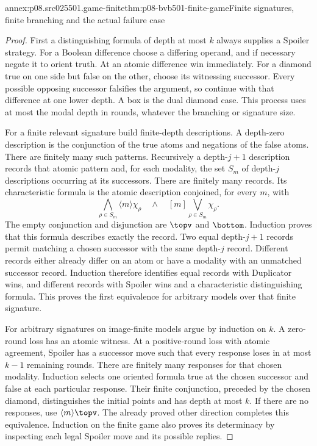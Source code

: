 \begin{annexitem}{annex:p08.src025501.game-finite}{thm:p08-bvb501-finite-game}{Finite signatures, finite branching and the actual failure case}
\begin{proof}
First a distinguishing formula of depth at most \(k\) always supplies
a Spoiler strategy. For a Boolean difference choose a differing operand,
and if necessary negate it to orient truth. At an atomic difference win
immediately. For a diamond true on one side but false on the other,
choose its witnessing successor. Every possible opposing successor falsifies
the argument, so continue with that difference at one lower depth. A box
is the dual diamond case. This process uses at most the modal depth in
rounds, whatever the branching or signature size.

For a finite relevant signature build finite-depth descriptions. A depth-zero
description is the conjunction of the true atoms and negations of the false
atoms. There are finitely many such patterns. Recursively a depth-\(j+1\)
description records that atomic pattern and, for each modality, the set
\(S_m\) of depth-\(j\) descriptions occurring at its successors.
There are finitely many records. Its characteristic formula is the atomic
description conjoined, for every \(m\), with
\[
 \bigwedge_{\rho\in S_m}\langle m\rangle\chi_\rho
 \quad\land\quad
 [m]\bigvee_{\rho\in S_m}\chi_\rho.
\]
The empty conjunction and disjunction are \(\topv\) and \(\bottom\).
Induction proves that this formula describes exactly the record. Two equal
depth-\(j+1\) records permit matching a chosen successor with the same
depth-\(j\) record. Different records either already differ on an atom
or have a modality with an unmatched successor record. Induction therefore
identifies equal records with Duplicator wins, and different records with
Spoiler wins and a characteristic distinguishing formula. This proves
the first equivalence for arbitrary models over that finite signature.

For arbitrary signatures on image-finite models argue by induction on \(k\).
A zero-round loss has an atomic witness. At a positive-round loss with
atomic agreement, Spoiler has a successor move such that every response
loses in at most \(k-1\) remaining rounds. There are finitely many
responses for that chosen modality. Induction selects one oriented formula
true at the chosen successor and false at each particular response. Their
finite conjunction, preceded by the chosen diamond, distinguishes the
initial points and has depth at most \(k\). If there are no responses,
use \(\langle m\rangle\topv\). The already proved other direction
completes this equivalence. Induction on the finite game also proves its
determinacy by inspecting each legal Spoiler move and its possible replies.


\end{proof}
\end{annexitem}
